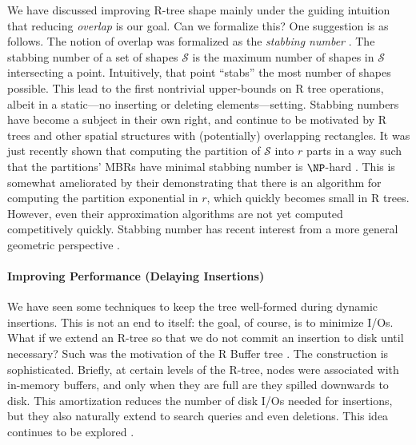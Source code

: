 We have discussed improving R-tree shape mainly under the guiding intuition that reducing \emph{overlap} is our goal.
Can we formalize this?
One suggestion is as follows.
The notion of overlap was formalized as the \emph{stabbing number} \cite{berggudmundssonhammarovermars00}.
The stabbing number of a set of shapes $\mathcal S$ is the maximum number of shapes in $\mathcal S$ intersecting a point.
Intuitively, that point ``stabs'' the most number of shapes possible.
This lead to the first nontrivial upper-bounds on R tree operations, albeit in a static---no inserting or deleting elements---setting.
Stabbing numbers have become a subject in their own right, and continue to be motivated by R trees and other spatial structures with (potentially) overlapping rectangles.
It was just recently shown that computing the partition of $\mathcal S$ into $r$ parts in a way such that the partitions' MBRs have minimal stabbing number is $\NP$-hard \cite{bergkhosraviverdonschotweele11}.
This is somewhat ameliorated by their demonstrating that there is an algorithm for computing the partition exponential in $r$, which quickly becomes small in R trees.
However, even their approximation algorithms are not yet computed competitively quickly.
Stabbing number has recent interest from a more general geometric perspective \cite{durochermehrabi12}.

\paragraph{Improving Performance (Delaying Insertions)}
We have seen some techniques to keep the tree well-formed during dynamic insertions.
This is not an end to itself: the goal, of course, is to minimize I/Os.
What if we extend an R-tree so that we do not commit an insertion to disk until necessary?
Such was the motivation of the R Buffer tree \cite{argehinrichsvahrenholdvitter99}.
The construction is sophisticated.
Briefly, at certain levels of the R-tree, nodes were associated with in-memory buffers, and only when they are full are they spilled downwards to disk.
This amortization reduces the number of disk I/Os needed for insertions, but they also naturally extend to search queries and even deletions.
This idea continues to be explored \cite{biveinissaltenisjensen07}.

